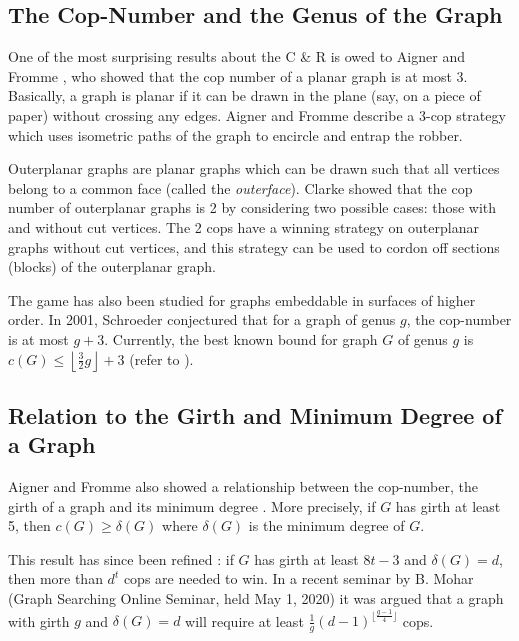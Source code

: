 \subsection{The Cop-Number and the Genus of the Graph}\label{intro cops and genus}

One of the most surprising results about the C \& R is owed to Aigner and Fromme \cite{aigner1984game}, who showed that the cop number of a planar graph is at most 3.
Basically, a graph is planar if it can be drawn in the plane (say, on a piece of paper) without crossing any edges. Aigner and Fromme describe a 3-cop strategy which uses isometric paths of the graph to encircle and entrap the robber.

Outerplanar graphs are planar graphs which can be drawn such that all vertices belong to a common face
(called the \textit{outerface}). Clarke \cite{clarke2002constrained} showed that the cop number of outerplanar graphs is 2 by considering
two possible cases: those with and without cut vertices. The 2 cops have a winning strategy on outerplanar graphs without cut vertices, and this strategy can be used to cordon off sections (blocks)
of the outerplanar graph.

The game has also been studied for graphs embeddable in surfaces of higher order.
In 2001, Schroeder conjectured \cite{bonato2017topological} that for a graph of genus $g$,
the cop-number is at most $g+3$. Currently, the best known bound for graph $G$ of genus $g$ is $c(G) \leq \left\lfloor \frac{3}{2}g \right\rfloor +3$ (refer to \cite{schroder2001copnumber}).

\subsection{Relation to the Girth and Minimum Degree of a Graph}

Aigner and Fromme also showed a relationship between the cop-number, the girth of a graph and
its minimum degree \cite{aigner1984game}. More precisely, if $G$ has girth at least 5, then $c(G)\geq \delta(G)$ where $\delta(G)$ is the minimum degree of $G$.

This result has since been refined \cite{frankl1987cops}: if $G$ has girth at least $8t-3$ and $\delta(G) = d$, then more than $d^t$ cops are needed to win. In a recent
seminar by B. Mohar (Graph Searching Online Seminar, held May 1, 2020) it was
argued that a graph with girth $g$ and $\delta(G)=d$ will require at least $\tfrac{1}{g}(d-1)^{\lfloor \frac{g-1}{4} \rfloor}$ cops.

